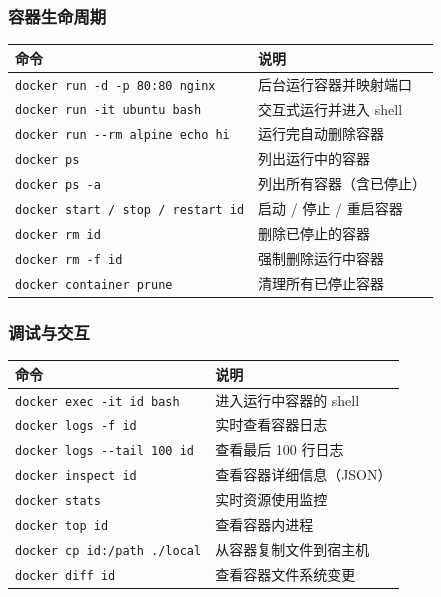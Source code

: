 \subsubsection{容器生命周期}

\begin{center}
\begin{tabular}{ll}
\toprule
命令 & 说明 \\
\midrule
\verb|docker run -d -p 80:80 nginx| & 后台运行容器并映射端口 \\
\verb|docker run -it ubuntu bash| & 交互式运行并进入 shell \\
\verb|docker run --rm alpine echo hi| & 运行完自动删除容器 \\
\verb|docker ps| & 列出运行中的容器 \\
\verb|docker ps -a| & 列出所有容器（含已停止） \\
\verb|docker start / stop / restart id| & 启动 / 停止 / 重启容器 \\
\verb|docker rm id| & 删除已停止的容器 \\
\verb|docker rm -f id| & 强制删除运行中容器 \\
\verb|docker container prune| & 清理所有已停止容器 \\
\bottomrule
\end{tabular}
\end{center}

\subsubsection{调试与交互}

\begin{center}
\begin{tabular}{ll}
\toprule
命令 & 说明 \\
\midrule
\verb|docker exec -it id bash| & 进入运行中容器的 shell \\
\verb|docker logs -f id| & 实时查看容器日志 \\
\verb|docker logs --tail 100 id| & 查看最后 100 行日志 \\
\verb|docker inspect id| & 查看容器详细信息（JSON） \\
\verb|docker stats| & 实时资源使用监控 \\
\verb|docker top id| & 查看容器内进程 \\
\verb|docker cp id:/path ./local| & 从容器复制文件到宿主机 \\
\verb|docker diff id| & 查看容器文件系统变更 \\
\bottomrule
\end{tabular}
\end{center}

